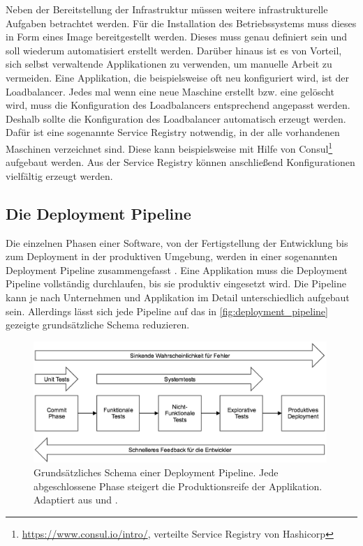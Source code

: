 Neben der Bereitstellung der Infrastruktur müssen weitere infrastrukturelle Aufgaben betrachtet werden. Für die Installation des Betriebssystems muss dieses in Form eines Image bereitgestellt werden. Dieses muss genau definiert sein und soll wiederum automatisiert erstellt werden. Darüber hinaus ist es von Vorteil, sich selbst verwaltende Applikationen zu verwenden, um manuelle Arbeit zu vermeiden. Eine Applikation, die beispielsweise oft neu konfiguriert wird, ist der Loadbalancer. Jedes mal wenn eine neue Maschine erstellt bzw. eine gelöscht wird, muss die Konfiguration des Loadbalancers entsprechend angepasst werden. Deshalb sollte die Konfiguration des Loadbalancer automatisch erzeugt werden. Dafür ist eine sogenannte Service Registry notwendig, in der alle vorhandenen Maschinen verzeichnet sind. Diese kann beispielsweise mit Hilfe von Consul\footnote{\url{https://www.consul.io/intro/}, verteilte Service Registry von Hashicorp} aufgebaut werden. Aus der Service Registry können anschließend Konfigurationen vielfältig erzeugt werden. 

\subsection{Die Deployment Pipeline}
\label{sec:devops:pipeline}
Die einzelnen Phasen einer Software, von der Fertigstellung der Entwicklung bis zum Deployment in der produktiven Umgebung, werden in einer sogenannten Deployment Pipeline zusammengefasst \cite{humble2010}. Eine Applikation muss die Deployment Pipeline vollständig durchlaufen, bis sie produktiv eingesetzt wird. Die Pipeline kann je nach Unternehmen und Applikation im Detail unterschiedlich aufgebaut sein. Allerdings lässt sich jede Pipeline auf das in \autoref{fig:deployment_pipeline} gezeigte grundsätzliche Schema reduzieren.

\begin{figure}[ht]
	\centering
	\includegraphics[width=0.99\textwidth]{img/deployment_pipeline.png}
	\caption[Schema einer Deployment Pipeline, adaptiert aus \cite{humble2010} und \cite{wolff2014}]{Grundsätzliches Schema einer Deployment Pipeline. Jede abgeschlossene Phase steigert die Produktionsreife der Applikation. Adaptiert aus \cite{humble2010} und \cite{wolff2014}.}
	\label{fig:deployment_pipeline}
\end{figure} 

